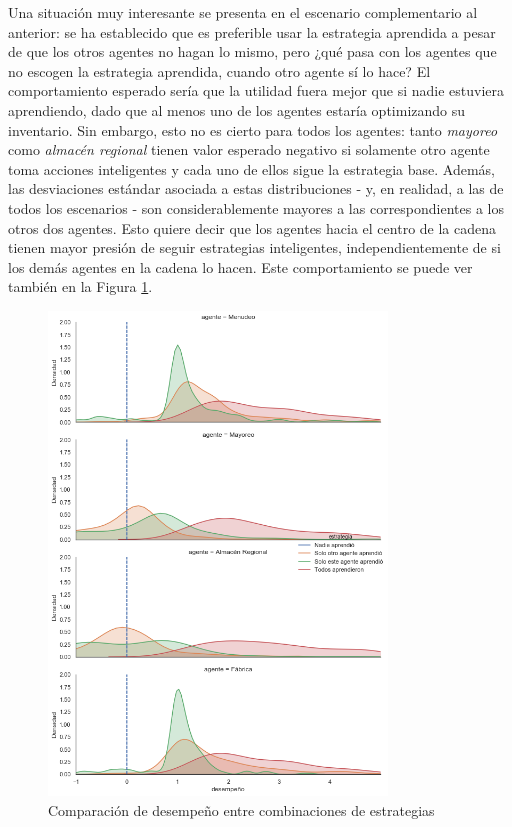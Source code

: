 Una situaci\'on muy interesante se presenta en el escenario complementario al anterior: se ha establecido que es preferible usar la estrategia aprendida a pesar de que los otros agentes no hagan lo mismo, pero ¿qu\'e pasa con los agentes que no escogen la estrategia aprendida, cuando otro agente s\'i lo hace? El comportamiento esperado ser\'ia que la utilidad fuera mejor que si nadie estuviera aprendiendo, dado que al menos uno de los agentes estar\'ia optimizando su inventario. Sin embargo, esto no es cierto para todos los agentes: tanto \textit{mayoreo} como \textit{almac\'en regional} tienen valor esperado negativo si solamente otro agente toma acciones inteligentes y cada uno de ellos sigue la estrategia base. Adem\'as, las desviaciones est\'andar asociada a estas distribuciones - y, en realidad, a las de todos los escenarios - son considerablemente mayores a las correspondientes a los otros dos agentes. Esto quiere decir que los agentes hacia el centro de la cadena tienen mayor presi\'on de seguir estrategias inteligentes, independientemente de si los dem\'as agentes en la cadena lo hacen. Este comportamiento se puede ver tambi\'en en la Figura \ref{ev_policies_dumb}.\\

\begin{figure}[H]
\caption{Comparaci\'on de desempe\~no entre combinaciones de estrategias}
\label{ev_policies_dumb}
\includegraphics[width=9cm]{tesis_tex/figs/evaluating_policies_dumb_to_smart.png}
\centering
\end{figure}


